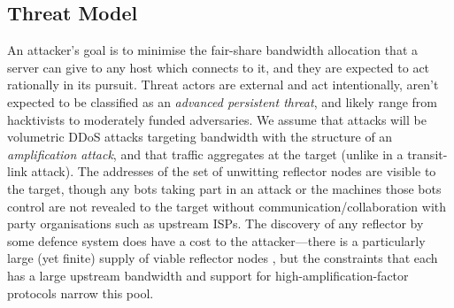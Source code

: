 \documentclass[10pt, times, conference, letterpaper]{IEEEtran}
\begin{document}
%

\subsection{Threat Model}
An attacker's goal is to minimise the fair-share bandwidth allocation that a server can give to any host which connects to it, and they are expected to act rationally in its pursuit.
Threat actors are external and act intentionally, aren't expected to be classified as an \emph{advanced persistent threat}, and likely range from hacktivists to moderately funded adversaries.
We assume that attacks will be volumetric DDoS attacks targeting bandwidth with the structure of an \emph{amplification attack}, and that traffic aggregates at the target (unlike in a transit-link attack).
The addresses of the set of unwitting reflector nodes are visible to the target, though any bots taking part in an attack or the machines those bots control are not revealed to the target without communication/collaboration with  party organisations such as upstream ISPs.
The discovery of any reflector by some defence system does have a cost to the attacker---there is a particularly large (yet finite) supply of viable reflector nodes \cite{DBLP:conf/ndss/Rossow14}, but the constraints that each has a large upstream bandwidth and support for high-amplification-factor protocols narrow this pool.
\end{document}
